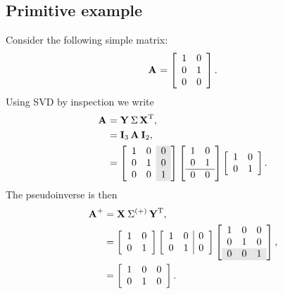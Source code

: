 \subsection{Primitive example}
Consider the following simple matrix:
\begin{equation}
  \A{}= \mat{cc}{1&0\\0&1\\0&0}.
\end{equation}
Using SVD by inspection we write
\begin{equation}
\begin{split}
  \svda{T},\\
  &= \I{3}\, \A{}\, \I{2},\\
  &= \mat{cc>{\columncolor{ltgray}}c}{1&0&0\\0&1&0\\0&0&1} \mat{cc}{1&0\\0&1\\\hline0&0} \itwo.
\end{split}
\end{equation}
The pseudoinverse is then
\begin{equation}
  \begin{split}
     \mpgia{T}, \\
     & = \itwo \mat{cc|c}{1&0&0\\0&1&0} \mat{ccc}{1&0&0\\0&1&0\\\rowcolor{ltgray}0&0&1},\\
     & = \mat{ccc}{1&0&0\\0&1&0}.
  \end{split}
\end{equation}

